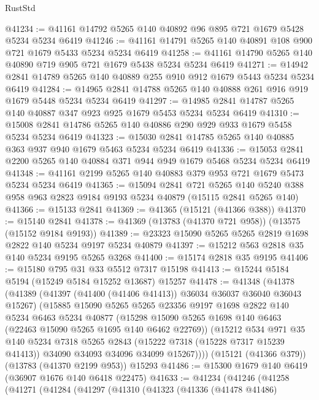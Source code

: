 \begin{lexlean}{RustStd}
\begin{coremodule}
@41234 := @41161 @14792 @5265 @140 @40892 @96 @895 @721 @1679 @5428 @5234 @5234 @6419
@41246 := @41161 @14791 @5265 @140 @40891 @108 @900 @721 @1679 @5433 @5234 @5234 @6419
@41258 := @41161 @14790 @5265 @140 @40890 @719 @905 @721 @1679 @5438 @5234 @5234 @6419
@41271 := @14942 @2841 @14789 @5265 @140 @40889 @255 @910 @912 @1679 @5443 @5234 @5234 @6419
@41284 := @14965 @2841 @14788 @5265 @140 @40888 @261 @916 @919 @1679 @5448 @5234 @5234 @6419
@41297 := @14985 @2841 @14787 @5265 @140 @40887 @347 @923 @925 @1679 @5453 @5234 @5234 @6419
@41310 := @15008 @2841 @14786 @5265 @140 @40886 @290 @929 @933 @1679 @5458 @5234 @5234 @6419
@41323 := @15030 @2841 @14785 @5265 @140 @40885 @363 @937 @940 @1679 @5463 @5234 @5234 @6419
@41336 := @15053 @2841 @2200 @5265 @140 @40884 @371 @944 @949 @1679 @5468 @5234 @5234 @6419
@41348 := @41161 @2199 @5265 @140 @40883 @379 @953 @721 @1679 @5473 @5234 @5234 @6419
@41365 := @15094
    @2841
    @721
    @5265
    @140
    @5240
    @388
    @958
    @963
    @2823
    @9184
    @9193
    @5234
    @40879
    (@15115 @2841 @5265 @140)
@41366 := @15133 @2841
@41369 := @41365 (@15121 (@41366 @388))
@41370 := @15140 @2841
@41378 := @41369 (@13783 (@41370 @721 @958)) (@13575 (@15152 @9184 @9193))
@41389 := @23323 @15090 @5265 @5265 @2819 @1698 @2822 @140 @5234 @9197 @5234 @40879
@41397 := @15212 @563 @2818 @35 @140 @5234 @9195 @5265 @3268
@41400 := @15174 @2818 @35 @9195
@41406 := @15180 @795 @31 @33 @5512 @7317 @15198
@41413 := @15244 @5184 @5194 (@15249 @5184 @15252 @13687) @15257
@41478 := @41348
    (@41378
      (@41389
        (@41397 (@41400 (@41406 @41413)) @36034 @36037 @36040 @36043 @15267)
        (@15885
          @15090
          @5265
          @5265
          @23356
          @9197
          @1698
          @2822
          @140
          @5234
          @6463
          @5234
          @40877
          (@15298 @15090 @5265 @1698 @140 @6463 (@22463 @15090 @5265 @1695 @140 @6462 @22769))
          (@15212
            @534
            @971
            @35
            @140
            @5234
            @7318
            @5265
            @2843
            (@15222 @7318 (@15228 @7317 @15239 @41413))
            @34090
            @34093
            @34096
            @34099
            @15267))))
    (@15121 (@41366 @379))
    (@13783 (@41370 @2199 @953))
    @15293
@41486 := @15300 @1679 @140 @6419 (@36907 @1676 @140 @6418 @22475)
@41633 := @41234
    (@41246
      (@41258
        (@41271
          (@41284
            (@41297
              (@41310
                (@41323
                  (@41336
                    (@41478 @41486)

\end{coremodule}
\end{lexlean}
